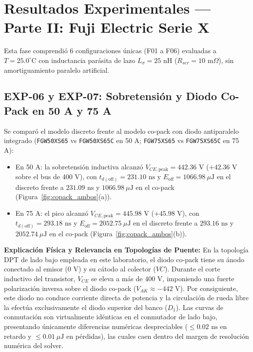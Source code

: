 \documentclass[11pt,a4paper]{article}
\begin{document}
\section{Resultados Experimentales — Parte II: Fuji Electric Serie X}

Esta fase comprendió 6 configuraciones únicas (F01 a F06) evaluadas a $T = 25.0^\circ\text{C}$ con inductancia parásita de lazo $L_\sigma = 25\text{ nH}$ ($R_{ser} = 10\text{ m}\Omega$), sin amortiguamiento paralelo artificial.

\subsection{EXP-06 y EXP-07: Sobretensión y Diodo Co-Pack en 50 A y 75 A}
Se comparó el modelo discreto frente al modelo co-pack con diodo antiparalelo integrado (\texttt{FGW50XS65} vs \texttt{FGW50XS65C} en 50 A; \texttt{FGW75XS65} vs \texttt{FGW75XS65C} en 75 A):
\begin{itemize}[leftmargin=*, noitemsep, topsep=2pt]
  \item En 50 A: la sobretensión inductiva alcanzó $V_{CE,\text{peak}} = 442.36\text{ V}$ ($+42.36\text{ V}$ sobre el bus de 400 V), con $t_{d(\text{off})} = 231.10\text{ ns}$ y $E_{\text{off}} = 1066.98\ \mu\text{J}$ en el discreto frente a $231.09\text{ ns}$ y $1066.98\ \mu\text{J}$ en el co-pack (Figura~\ref{fig:copack_ambos}(a)).
  \item En 75 A: el pico alcanzó $V_{CE,\text{peak}} = 445.98\text{ V}$ ($+45.98\text{ V}$), con $t_{d(\text{off})} = 293.18\text{ ns}$ y $E_{\text{off}} = 2052.75\ \mu\text{J}$ en el discreto frente a $293.16\text{ ns}$ y $2052.74\ \mu\text{J}$ en el co-pack (Figura~\ref{fig:copack_ambos}(b)).
\end{itemize}
\textbf{Explicación Física y Relevancia en Topologías de Puente:} En la topología DPT de lado bajo empleada en este laboratorio, el diodo co-pack tiene su ánodo conectado al emisor ($0\text{ V}$) y su cátodo al colector ($VC$). Durante el corte inductivo del transistor, $V_{CE}$ se eleva a más de $400\text{ V}$, imponiendo una fuerte polarización inversa sobre el diodo co-pack ($V_{AK} \approx -442\text{ V}$). Por consiguiente, este diodo no conduce corriente directa de potencia y la circulación de rueda libre la efectúa exclusivamente el diodo superior del banco ($D_1$). Las curvas de conmutación son virtualmente idénticas en el conmutador de lado bajo, presentando únicamente diferencias numéricas despreciables ($\le 0.02\text{ ns}$ en retardo y $\le 0.01\ \mu\text{J}$ en pérdidas), las cuales caen dentro del margen de resolución numérica del solver.
\end{document}
